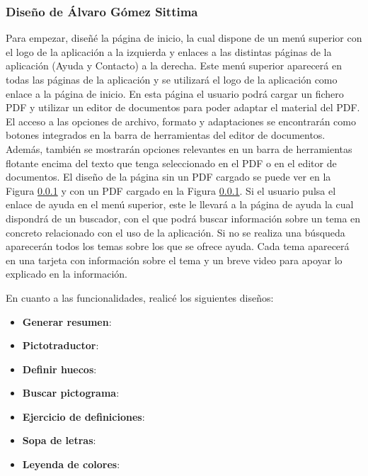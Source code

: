 \subsubsection{Diseño de Álvaro Gómez Sittima}
Para empezar, diseñé la página de inicio, la cual dispone de un menú superior con el logo de la aplicación a la izquierda y enlaces a las distintas páginas de la aplicación (Ayuda y Contacto) a la derecha. Este menú superior aparecerá en todas las páginas de la aplicación y se utilizará el logo de la aplicación como enlace a la página de inicio. En esta página el usuario podrá cargar un fichero PDF y utilizar un editor de documentos para poder adaptar el material del PDF. El acceso a las opciones de archivo, formato y adaptaciones se encontrarán como botones integrados en la barra de herramientas del editor de documentos. Además, también se mostrarán opciones relevantes en un barra de herramientas flotante encima del texto que tenga seleccionado en el PDF o en el editor de documentos. El diseño de la página sin un PDF cargado se puede ver en la Figura \ref{} y con un PDF cargado en la Figura \ref{}. Si el usuario pulsa el enlace de ayuda en el menú superior, este le llevará a la página de ayuda la cual dispondrá de un buscador, con el que podrá buscar información sobre un tema en concreto relacionado con el uso de la aplicación. Si no se realiza una búsqueda aparecerán todos los temas sobre los que se ofrece ayuda. Cada tema aparecerá en una tarjeta con información sobre el tema y un breve video para apoyar lo explicado en la información.

En cuanto a las funcionalidades, realicé los siguientes diseños:
\begin{itemize}
  \item \textbf{Generar resumen}:
  \item \textbf{Pictotraductor}:
  \item \textbf{Definir huecos}:
  \item \textbf{Buscar pictograma}:
  \item \textbf{Ejercicio de definiciones}:
  \item \textbf{Sopa de letras}:
  \item \textbf{Leyenda de colores}:
\end{itemize}

